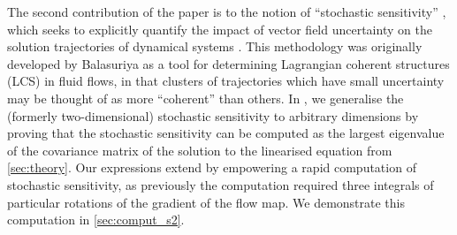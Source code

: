 The second contribution of the paper is to the notion of ``stochastic sensitivity'' \cite{Balasuriya_2020_StochasticSensitivityComputable}, which seeks to explicitly quantify the impact of vector field uncertainty on the solution trajectories of dynamical systems \cite{BranickiUda_2021_LagrangianUncertaintyQuantification,KaszasHaller_2020_UniversalUpperEstimate,BranickiUda_2023_PathBasedDivergenceRates,Balibrea-IniestaEtAl_2016_LagrangianDescriptorsStochastic}.
This methodology was originally developed by Balasuriya \cite{Balasuriya_2020_StochasticSensitivityComputable} as a tool for determining Lagrangian coherent structures (LCS) \cite{BalasuriyaEtAl_2018_GeneralizedLagrangianCoherent,HadjighasemEtAl_2017_CriticalComparisonLagrangian} in fluid flows, in that clusters of trajectories which have small uncertainty may be thought of as more ``coherent'' than others.
In , we generalise the (formerly two-dimensional) stochastic sensitivity to arbitrary dimensions by proving that the stochastic sensitivity can be computed as the largest eigenvalue of the covariance matrix of the solution to the linearised equation from \cref{sec:theory}.
Our expressions extend \cite{Balasuriya_2020_StochasticSensitivityComputable} by empowering a rapid computation of stochastic sensitivity, as previously the computation required three integrals of particular rotations of the gradient of the flow map.
We demonstrate this computation in \cref{sec:comput_s2}.



